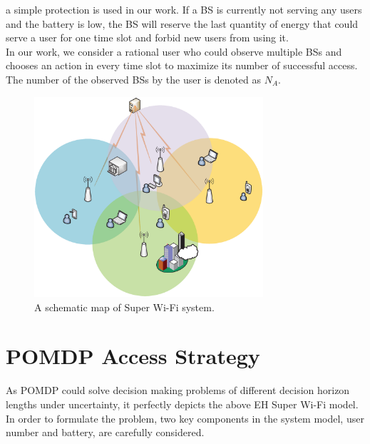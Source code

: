 \documentclass[conference]{IEEEtran}
\begin{document}
a simple protection is used in our work.
If a BS is currently not serving any users and the battery is low,
the BS will reserve the last quantity of energy that could serve a user
for one time slot and forbid new users from using it.\\\indent
In our work, we consider a rational user who could observe multiple BSs and
chooses an action in every time slot to maximize its number of successful access.
The number of the observed BSs by the user is denoted as \(N_A\).
\begin{figure}\label{fig1}
\centering
\includegraphics[width=8.5cm]{Fig1.eps}
\caption{A schematic map of Super Wi-Fi system.}
\end{figure}
\section{POMDP Access Strategy}
As POMDP could solve decision making problems of different decision horizon lengths under uncertainty,
it perfectly depicts the above EH Super Wi-Fi model.
In order to formulate the problem, two key components in the system model, user number and battery, are carefully considered.
\end{document}
